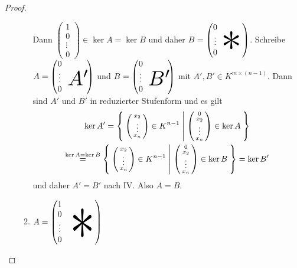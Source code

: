 \documentclass[../../main.tex]{subfiles}
\begin{document}
\begin{proof}
\begin{itemize}
\begin{enumerate}[{Fall }1:]
Dann $\begin{pmatrix}1\\0\\\vdots\\0\end{pmatrix}\in \ker A=\ker B$ und daher
$B=\begin{pmatrix}
0&&&\\
\vdots&&
\begin{tikzpicture}[overlay]\node[xshift=-0.3em,yshift=0.5em,scale=5]{$*$};\end{tikzpicture}&\\
0&&&
\end{pmatrix}$.
Schreibe $A=\begin{pmatrix}0&&&\\\vdots&&
\begin{tikzpicture}[overlay]\node[yshift=0.5em,scale=2.5]{$A'$};\end{tikzpicture}&\\
0&&&
\end{pmatrix}$ und
$B=\begin{pmatrix}0&&&\\\vdots&&
\begin{tikzpicture}[overlay]\node[yshift=0.5em,scale=2.5]{$B'$};\end{tikzpicture}&\\
0&&&
\end{pmatrix}$ mit $A',B'\in K^{m\times(n-1)}$. Dann sind $A'$ und $B'$ in reduzierter Stufenform und es gilt 
\begin{multline*}
\ker A'=\Set{\left(\begin{smallmatrix}x_2\\\vdots\\x_n\end{smallmatrix}\right)\in K^{n-1} | \left(\begin{smallmatrix}0\\x_2\\\vdots\\x_n\end{smallmatrix}\right)\in \ker A}\\
\overset{\ker A=\ker B}=\Set{\left(\begin{smallmatrix}x_2\\\vdots\\x_n\end{smallmatrix}\right)\in K^{n-1} | \left(\begin{smallmatrix}0\\x_2\\\vdots\\x_n\end{smallmatrix}\right)\in \ker B}=\ker B'
\end{multline*} und daher $A'=B'$ nach IV. Also $A=B$.






\item $A=\begin{pmatrix}1&&&&\\0&&&&\\
\vdots&&&
\begin{tikzpicture}[overlay]\node[xshift=-0.5em,yshift=1em,xscale=6,yscale=8]{$*$};\end{tikzpicture}&\\
0&&&&
\end{pmatrix}$



\end{enumerate}
\end{itemize}
\end{proof}
\end{document}
